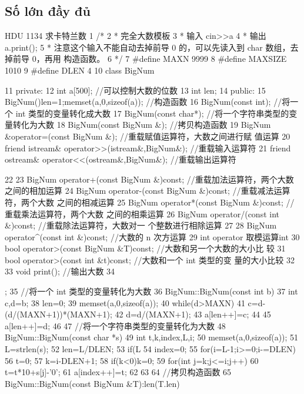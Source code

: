 \documentclass[11pt]{article}
\begin{document}
\subsection{Số lớn đầy đủ}

\begin{Code}
   HDU 1134 求卡特兰数
 1 /*
 2 * 完全大数模板
 3 * 输入 cin>>a
 4 * 输出 a.print();
 5 * 注意这个输入不能自动去掉前导 0 的，可以先读入到 char 数组，去掉前导 0，再用
       构造函数。
 6 */
 7 #define MAXN 9999
 8 #define MAXSIZE 1010
 9 #define DLEN 4
10 class BigNum{
11 private:
12     int a[500]; //可以控制大数的位数
13     int len;
14 public:
15     BigNum(){len=1;memset(a,0,sizeof(a));} //构造函数
16     BigNum(const int);     //将一个 int 类型的变量转化成大数
17     BigNum(const char*);   //将一个字符串类型的变量转化为大数
18     BigNum(const BigNum &); //拷贝构造函数
19     BigNum &operator=(const BigNum &); //重载赋值运算符，大数之间进行赋
          值运算
20     friend istream& operator>>(istream&,BigNum&); //重载输入运算符
21     friend ostream& operator<<(ostream&,BigNum&); //重载输出运算符


22
23       BigNum operator+(const BigNum &)const;    //重载加法运算符，两个大数
            之间的相加运算
24       BigNum operator-(const BigNum &)const;    //重载减法运算符，两个大数
            之间的相减运算
25       BigNum operator*(const BigNum &)const;    //重载乘法运算符，两个大数
            之间的相乘运算
26       BigNum operator/(const int &)const;       //重载除法运算符，大数对一
            个整数进行相除运算
27
28       BigNum operator^(const int &)const;       //大数的 n 次方运算
29       int operator%
            取模运算int
30       bool operator>(const BigNum &T)const;     //大数和另一个大数的大小比
            较
31       bool operator>(const int &t)const;        //大数和一个 int 类型的变
            量的大小比较
32
33       void print();         //输出大数
34   };
35   //将一个 int 类型的变量转化为大数
36   BigNum::BigNum(const int b){
37       int c,d=b;
38       len=0;
39       memset(a,0,sizeof(a));
40       while(d>MAXN){
41           c=d-(d/(MAXN+1))*(MAXN+1);
42           d=d/(MAXN+1);
43           a[len++]=c;
44       }
45       a[len++]=d;
46   }
47   //将一个字符串类型的变量转化为大数
48   BigNum::BigNum(const char *s){
49       int t,k,index,L,i;
50       memset(a,0,sizeof(a));
51       L=strlen(s);
52       len=L/DLEN;
53       if(L%
54       index=0;
55       for(i=L-1;i>=0;i-=DLEN){
56           t=0;
57           k=i-DLEN+1;
58           if(k<0)k=0;
59           for(int j=k;j<=i;j++)
60                t=t*10+s[j]-'0';
61           a[index++]=t;
62       }
63   }
64   //拷贝构造函数
65   BigNum::BigNum(const BigNum &T):len(T.len){


}
\end{Code}
\end{document}
